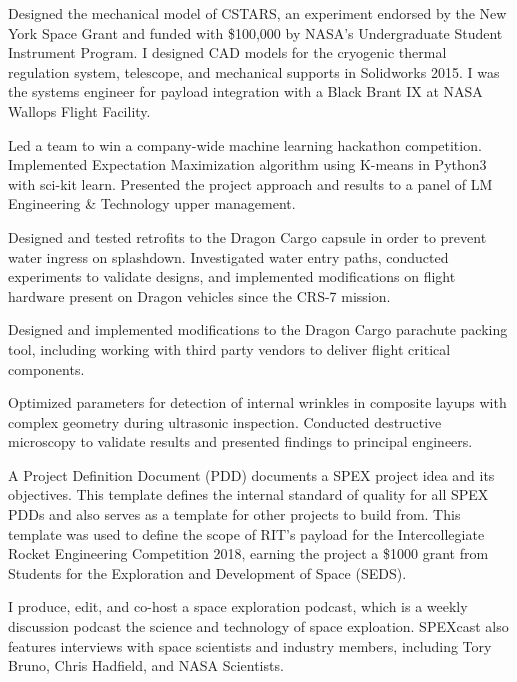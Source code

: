 \documentclass[10pt,final,sans]{resume}
\begin{document}
Designed the mechanical model of CSTARS, an experiment endorsed by the New York
Space Grant and funded with \$100,000 by NASA's Undergraduate Student Instrument
Program. I designed CAD models for the cryogenic thermal regulation system,
telescope, and mechanical supports in Solidworks 2015. I was the systems
engineer for payload integration with a Black Brant IX at NASA Wallops Flight
Facility.

Led a team to win a company-wide machine learning hackathon competition.
Implemented Expectation Maximization algorithm using K-means in Python3 with
sci-kit learn. Presented the project approach and results to a panel of LM
Engineering \& Technology upper management. 

Designed and tested retrofits to the Dragon Cargo capsule in order to prevent
water ingress on splashdown. Investigated water entry paths, conducted
experiments to validate designs, and implemented modifications on flight
hardware present on Dragon vehicles since the CRS-7 mission.

Designed and implemented modifications to the Dragon Cargo parachute packing
tool, including working with third party vendors to deliver flight critical
components.

Optimized parameters for detection of internal wrinkles in composite layups with
complex geometry during ultrasonic inspection. Conducted destructive microscopy
to validate results and presented findings to principal engineers.

A Project Definition Document (PDD) documents a SPEX project idea and its
objectives. This template defines the internal standard of quality for all SPEX
PDDs and also serves as a template for other projects to build from. This
template was used to define the scope of RIT's payload for the Intercollegiate
Rocket Engineering Competition 2018, earning the project a \$1000 grant from
Students for the Exploration and Development of Space (SEDS).

I produce, edit, and co-host a space exploration podcast, which is a weekly
discussion podcast the science and technology of space exploation. SPEXcast also
features interviews with space scientists and industry members, including Tory
Bruno, Chris Hadfield, and NASA Scientists.
\end{document}
